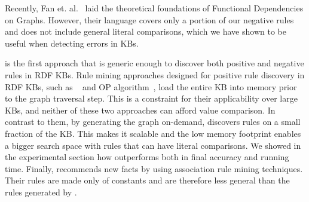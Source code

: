 %
Recently, Fan et. al.~\cite{FanFDGraphs} laid the theoretical foundations of Functional Dependencies on Graphs. %
However, their language covers only a portion of our negative rules %
and does not include general literal comparisons, which we have shown to be useful when detecting errors in KBs.

\krd is the first approach that is generic enough %
to discover both positive and negative rules in RDF KBs.
Rule mining approaches designed for positive rule discovery in RDF KBs, such as \amie~\cite{galarraga2015fast} and OP algorithm~\cite{Chen:2016}, load the entire KB into memory prior to 
the graph traversal step. %
This is a constraint for their applicability over large KBs, and neither of these two approaches can afford value comparison. 
In contrast to them, by generating the graph on-demand, \krd discovers rules on a small fraction of the KB. This makes it scalable and the low memory footprint enables a bigger search space with rules that can have literal comparisons. %
We showed in the experimental section how \krd outperforms \amie both in final accuracy and running time.
Finally, \cite{abedjan2014amending} recommends new facts by using association rule mining techniques. Their rules are made only of constants and are therefore less general than the rules generated by \krd.

